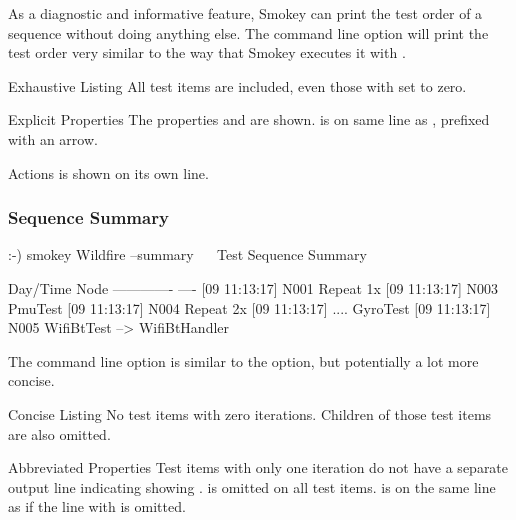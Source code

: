 As a diagnostic and informative feature, Smokey can print the test order of a
sequence without doing anything else.  The  command line
option will print the test order very similar to the way that Smokey executes
it with .

\begin{Property}

\item[Exhaustive Listing] All test items are included, even those with
 set to zero.

\item[Explicit Properties] The properties  and
 are shown.   is on same line as
, prefixed with an arrow.

\item[Actions]  is shown on its own line.

\end{Property}

\subsubsection{Sequence Summary}

\begin{LogExcerpt}
:-) smokey Wildfire --summary
~\elide~
Test Sequence Summary

Day/Time      Node
------------- ----
[09 11:13:17] N001 Repeat 1x
[09 11:13:17] N003      PmuTest
[09 11:13:17] N004      Repeat 2x
[09 11:13:17] ....              GyroTest
[09 11:13:17] N005      WifiBtTest --> WifiBtHandler
\end{LogExcerpt}

The  command line option is similar to the
 option, but potentially a lot more concise.

\begin{Property}

\item[Concise Listing] No test items with zero iterations.  Children of those
test items are also omitted.

\item[Abbreviated Properties] Test items with only one iteration do not have a
separate output line indicating showing .
 is omitted on all test items.   is on the same
line as  if the line with  is
omitted.

\end{Property}

